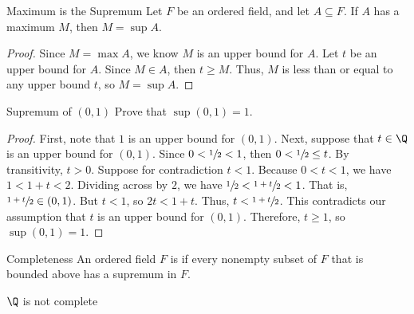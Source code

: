 \begin{thmbox}{Maximum is the Supremum}{}
    Let $F$ be an ordered field, and let $A \subseteq F$. If $A$ has a maximum $M$, then $M = \sup A$.
    \tcblower
    \begin{proof}
        Since $M = \max A$, we know $M$ is an upper bound for $A$. Let $t$ be an upper bound for $A$. Since $M \in A$, then $t \geq M$. Thus, $M$ is less than or equal to any upper bound $t$, so $M = \sup A$.
    \end{proof}
\end{thmbox}

\begin{exbox}{Supremum of $(0,1)$}{}
    Prove that $\sup (0,1) = 1$.
    \tcblower
    \begin{proof}
        First, note that $1$ is an upper bound for $(0,1)$. Next, suppose that $t \in \Q$ is an upper bound for $(0,1)$. Since $0 < \sfrac{1}{2} < 1$, then $0 < \sfrac{1}{2} \leq t$. By transitivity, $t > 0$. Suppose for contradiction $t < 1$. Because $0 < t < 1$, we have $1 < 1 + t < 2$. Dividing across by $2$, we have $\sfrac{1}{2} < \sfrac{1+t}{2} < 1$. That is, $\sfrac{1+t}{2} \in (0,1)$. But $t < 1$, so $2t < 1+t$. Thus, $t < \sfrac{1+t}{2}$. This contradicts our assumption that $t$ is an upper bound for $(0,1)$. Therefore, $t \geq 1$, so $\sup (0,1) = 1$.
    \end{proof}
\end{exbox}

\begin{dfnbox}{Completeness}{}
    An ordered field $F$ is  if every nonempty subset of $F$ that is bounded above has a supremum in $F$.
\end{dfnbox}



\begin{thmbox}{$\Q$ is not complete}{}

\end{thmbox}
